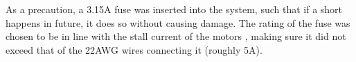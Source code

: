 \documentclass[main.tex]{subfiles}
\begin{document}
	As a precaution, a 3.15A fuse was inserted into the system, such that if a short happens in future, it does so without causing damage. The rating of the fuse was chosen to be in line with the stall current of the motors \cite{motor}, making sure it did not exceed that of the 22AWG wires connecting it (roughly 5A).




\bib
\end{document}
